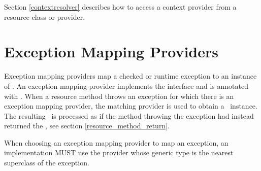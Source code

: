 Section \ref{contextresolver} describes how to access a context provider from a resource class or provider.

\section{Exception Mapping Providers}
\label{exceptionmapper}

Exception mapping providers map a checked or runtime exception to an instance of \Response. An exception mapping provider implements the  interface and is annotated with \Provider. When a resource method throws an exception for which there is an exception mapping provider, the matching provider is used to obtain a \Response\ instance. The resulting \Response\ is processed as if the method throwing the exception had instead returned the \Response, see section \ref{resource_method_return}.

When choosing an exception mapping provider to map an exception, an implementation MUST use the provider whose generic type is the nearest superclass of the exception.
